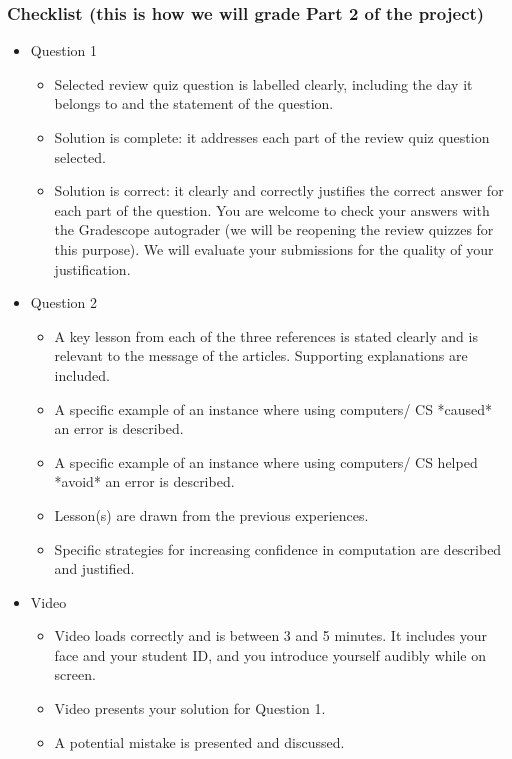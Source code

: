 \subsubsection*{Checklist (this is how we will grade Part 2 of the project)}
\begin{itemize}
\item Question 1
    \begin{itemize}
        \item Selected review quiz question is labelled clearly, including the day 
        it belongs to and the statement of the question.
        \item Solution is complete: it addresses each part of the review quiz question selected.
        \item Solution is correct: it clearly and correctly justifies the correct answer 
        for each part of the question. You are welcome to check your answers with the 
        Gradescope autograder (we will be reopening the review quizzes for this purpose). 
        We will evaluate your submissions for the quality of your justification.
    \end{itemize}
\item Question 2
    \begin{itemize}
        \item A key lesson from each of the three references is stated clearly and 
        is relevant to the message of the articles. Supporting explanations are included.
        \item A specific example of an instance where using computers/ CS *caused* an error is described.
        \item A specific example of an instance where using computers/ CS helped *avoid* an error is described.
        \item Lesson(s) are drawn from the previous experiences.
        \item Specific strategies for increasing confidence in computation are described and justified.
    \end{itemize}
    \item Video
    \begin{itemize}
        \item Video loads correctly and is between 3 and 5 minutes. It includes your face and your student ID, 
        and you introduce yourself audibly while on screen.
        \item Video presents your solution for Question 1.
        \item A potential mistake is presented and discussed.
    \end{itemize}
\end{itemize}

